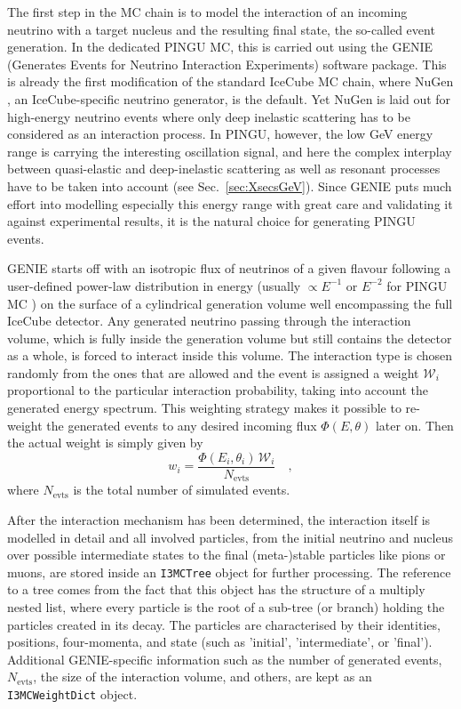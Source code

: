 The first step in the MC chain is to model the interaction of an incoming
neutrino with a target nucleus and the resulting final state, the so-called
event generation. In the dedicated PINGU MC, this is carried out using the
GENIE (Generates Events for Neutrino Interaction Experiments) \cite{GENIE}
software package. This is already the first modification of the standard
IceCube MC chain, where NuGen \cite{NuGen}, an IceCube-specific neutrino
generator, is the default. Yet NuGen is laid out for high-energy neutrino
events where only deep inelastic scattering has to be considered as an
interaction process. In PINGU, however, the low GeV energy range is carrying the
interesting oscillation signal, and here the complex interplay between
quasi-elastic and deep-inelastic scattering as well as resonant processes have
to be taken into account (see Sec.~\ref{sec:XsecsGeV}). Since GENIE puts much
effort into modelling especially this energy range with great care and
validating it against experimental results, it is the natural choice for
generating PINGU events.

GENIE starts off with an isotropic flux of neutrinos of a given flavour
following a user-defined power-law distribution in energy (usually $\propto
E^{-1}$ or $E^{-2}$ for PINGU MC \cite{PINGU_MC}) on the surface of a
cylindrical generation volume well encompassing the full IceCube detector. Any
generated neutrino passing through the interaction volume, which is fully inside
the generation volume but still contains the detector as a whole, is forced to
interact inside this volume. The interaction type is chosen randomly from the
ones that are allowed and the event is assigned a weight $\mathcal{W}_i$
proportional to the particular interaction probability, taking into account the
generated energy spectrum. This weighting strategy makes it possible to
re-weight the generated events to any desired incoming flux $\Phi(E, \theta)$
later on. Then the actual weight is simply given by
\begin{equation}
 w_i = \frac{\Phi(E_i, \theta_i)\,\mathcal{W}_i}{N_\mathrm{evts}} \quad,
 \label{eqn:reweight}
\end{equation}
where $N_\mathrm{evts}$ is the total number of simulated events.

After the interaction mechanism has been determined, the interaction itself is
modelled in detail and all involved particles, from the initial neutrino and
nucleus over possible intermediate states to the final (meta-)stable particles
like pions or muons, are stored inside an \texttt{I3MCTree} object for further
processing. The reference to a tree comes from the fact that this object has
the structure of a multiply nested list, where every particle is the root of a
sub-tree (or branch) holding the particles created in its decay. The particles
are characterised by their identities, positions, four-momenta, and state (such
as 'initial', 'intermediate', or 'final'). 
Additional GENIE-specific information such as the number of generated events,
$N_\mathrm{evts}$, the size of the interaction volume, and others, are kept as
an \texttt{I3MCWeightDict} object.

